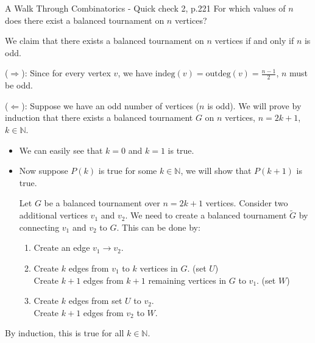 \begin{problem}{}{}{A Walk Through Combinatorics - Quick check 2, p.221 }
For which values of \(n\) does there exist a balanced
tournament on \(n\) vertices?
\end{problem}

\begin{solution}
    We claim that there exists a balanced tournament on $n$ vertices
    if and only if $n$ is odd.

    ($\Rightarrow$): Since for every vertex $v$, we have
    $\text{indeg}(v) = \text{outdeg}(v) = \frac{n-1}{2}$,
    $n$ must be odd.

    ($\Leftarrow$): Suppose we have an odd number of vertices ($n$ is odd).
    We will prove by induction that there exists a balanced tournament $G$
    on $n$ vertices, $n = 2k+1$, $k \in \mathbb{N}$.

    \begin{itemize}
        \item We can easily see that $k=0$ and $k=1$ is true.
        \item Now suppose $P(k)$ is true for some $k \in \mathbb{N}$,
              we will show that $P(k+1)$ is true.

              Let $G$ be a balanced tournament over $n = 2k+1$ vertices.
              Consider two additional vertices $v_1$ and $v_2$. We need to
              create a balanced tournament $\tilde{G}$ by connecting $v_1$
              and $v_2$ to $G$. This can be done by:

              \begin{enumerate}
                  \item Create an edge $v_1 \rightarrow v_2$.
                  \item Create $k$ edges from $v_1$ to $k$ vertices in $G$. (set $U$) \\
                        Create $k+1$ edges from $k+1$ remaining vertices in $G$ to $v_1$. (set $W$)
                  \item Create $k$ edges from set $U$ to $v_2$. \\
                        Create $k+1$ edges from $v_2$ to $W$.
              \end{enumerate}
    \end{itemize}

    By induction, this is true for all $k \in \mathbb{N}$.
\end{solution}